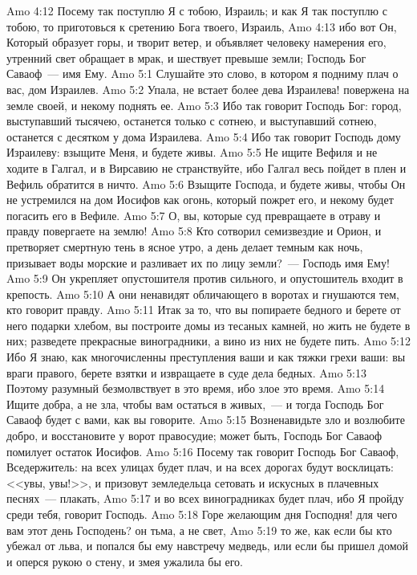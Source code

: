 \vs Amo 4:12 Посему так поступлю Я с тобою, Израиль; и как Я так поступлю с тобою, то приготовься к сретению Бога твоего, Израиль,
\vs Amo 4:13 ибо вот Он, Который образует горы, и творит ветер, и объявляет человеку намерения его, утренний свет обращает в мрак, и шествует превыше земли; Господь Бог Саваоф~--- имя Ему.
\vs Amo 5:1 Слушайте это слово, в котором я подниму плач о вас, дом Израилев.
\vs Amo 5:2 Упала, не встает более дева Израилева! повержена на земле своей, и некому поднять ее.
\vs Amo 5:3 Ибо так говорит Господь Бог: город, выступавший тысячею, останется только с сотнею, и выступавший сотнею, останется с десятком у дома Израилева.
\vs Amo 5:4 Ибо так говорит Господь дому Израилеву: взыщите Меня, и будете живы.
\vs Amo 5:5 Не ищите Вефиля и не ходите в Галгал, и в Вирсавию не странствуйте, ибо Галгал весь пойдет в плен и Вефиль обратится в ничто.
\vs Amo 5:6 Взыщите Господа, и будете живы, чтобы Он не устремился на дом Иосифов как огонь, который пожрет его, и некому будет погасить его в Вефиле.
\vs Amo 5:7 О, вы, которые суд превращаете в отраву и правду повергаете на землю!
\vs Amo 5:8 Кто сотворил семизвездие и Орион, и претворяет смертную тень в ясное утро, а день делает темным как ночь, призывает воды морские и разливает их по лицу земли?~--- Господь имя Ему!
\vs Amo 5:9 Он укрепляет опустошителя против сильного, и опустошитель входит в крепость.
\vs Amo 5:10 А они ненавидят обличающего в воротах и гнушаются тем, кто говорит правду.
\vs Amo 5:11 Итак за то, что вы попираете бедного и берете от него подарки хлебом, вы построите домы из тесаных камней, но жить не будете в них; разведете прекрасные виноградники, а вино из них не будете пить.
\vs Amo 5:12 Ибо Я знаю, как многочисленны преступления ваши и как тяжки грехи ваши: вы враги правого, берете взятки и извращаете в суде дела бедных.
\vs Amo 5:13 Поэтому разумный безмолвствует в это время, ибо злое это время.
\vs Amo 5:14 Ищите добра, а не зла, чтобы вам остаться в живых,~--- и тогда Господь Бог Саваоф будет с вами, как вы говорите.
\vs Amo 5:15 Возненавидьте зло и возлюбите добро, и восстановите у ворот правосудие; может быть, Господь Бог Саваоф помилует остаток Иосифов.
\vs Amo 5:16 Посему так говорит Господь Бог Саваоф, Вседержитель: на всех улицах будет плач, и на всех дорогах будут восклицать: <<увы, увы!>>, и призовут земледельца сетовать и искусных в плачевных песнях~--- плакать,
\vs Amo 5:17 и во всех виноградниках будет плач, ибо Я пройду среди тебя, говорит Господь.
\vs Amo 5:18 Горе желающим дня Господня! для чего вам этот день Господень? он тьма, а не свет,
\vs Amo 5:19 то же, как если бы кто убежал от льва, и попался бы ему навстречу медведь, или если бы пришел домой и оперся рукою о стену, и змея ужалила бы его.
